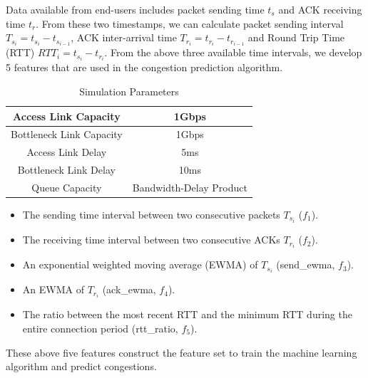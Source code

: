 \par Data available from end-users includes packet sending time $t_{s}$ and ACK receiving time $t_{r}$. From these two timestamps, we can calculate packet sending interval $T_{s_{i}} = t_{s_{i}} - t_{s_{i-1}}$, ACK inter-arrival time $T_{r_{i}} = t_{r_{i}} - t_{r_{i-1}}$ and Round Trip Time (RTT) $RTT_{i} = t_{s_{i}} - t_{r_{i}}$. From the above three available time intervals, we develop 5 features that are used in the congestion prediction algorithm.
\begin{table}
\begin{center}
\caption {Simulation Parameters} \label{tab:simuPara}
\begin{tabular}{ |c|c| }
 \hline
 Access Link Capacity & 1Gbps  \\
 \hline
 Bottleneck Link Capacity & 1Gbps  \\
 \hline
 Access Link Delay & 5ms  \\
 \hline
 Bottleneck Link Delay & 10ms\\
 \hline
 Queue Capacity & Bandwidth-Delay Product\\
 \hline
\end{tabular}
\end{center}
\end{table}
\begin{itemize}
\item The sending time interval between two consecutive packets $T_{s_{i}}$ ($f_{1}$).
\item The receiving time interval between two consecutive ACKs $T_{r_{i}}$ ($f_{2}$).
\item An exponential weighted moving average (EWMA) of $T_{s_{i}}$ (send\_ewma, $f_{3}$).
\item An EWMA of $T_{r_{i}}$ (ack\_ewma, $f_{4}$).
\item The ratio between the most recent RTT and the minimum RTT during the entire connection period (rtt\_ratio, $f_{5}$).
\end{itemize}

These above five features construct the feature set to train the machine learning algorithm and predict congestions.

